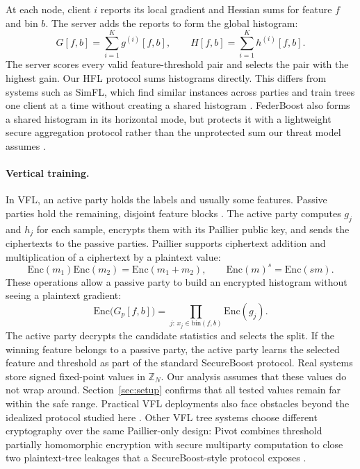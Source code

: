\documentclass[11pt]{article}
\newcommand{\rev}[1]{{\color{blue}#1}}
\begin{document}
At each node, client $i$ reports its local gradient and Hessian sums for feature $f$ and bin $b$. The server adds the reports to form the global histogram:
\begin{equation}
G[f,b] = \sum_{i=1}^K g^{(i)}[f,b], \qquad
H[f,b] = \sum_{i=1}^K h^{(i)}[f,b].
\label{eq:hflagg}
\end{equation}
The server scores every valid feature-threshold pair and selects the pair with the highest gain. Our HFL protocol sums histograms directly. This differs from systems such as SimFL, which find similar instances across parties and train trees one client at a time without creating a shared histogram \cite{li2020fedgbdt}. FederBoost also forms a shared histogram in its horizontal mode, but protects it with a lightweight secure aggregation protocol rather than the unprotected sum our threat model assumes \cite{tian2020federboost}.

\paragraph{Vertical training.}
In VFL, an active party holds the labels and usually some features. Passive parties hold the remaining, disjoint feature blocks \cite{cheng2021secureboost}. The active party computes $g_j$ and $h_j$ for each sample, encrypts them with its Paillier public key, and sends the ciphertexts to the passive parties. Paillier supports ciphertext addition and multiplication of a ciphertext by a plaintext value:
\begin{equation}
\mathrm{Enc}(m_1)\mathrm{Enc}(m_2)=\mathrm{Enc}(m_1+m_2), \qquad
\mathrm{Enc}(m)^s=\mathrm{Enc}(sm).
\label{eq:paillier}
\end{equation}
These operations allow a passive party to build an encrypted histogram without seeing a plaintext gradient:
\begin{equation}
\mathrm{Enc}\bigl(G_p[f,b]\bigr)
= \prod_{j:\,x_j\in\mathrm{bin}(f,b)} \mathrm{Enc}(g_j).
\label{eq:vflagg}
\end{equation}
The active party decrypts the candidate statistics and selects the split. If the winning feature belongs to a passive party, the active party learns the selected feature and threshold as part of the standard SecureBoost protocol. Real systems store signed fixed-point values in $\mathbb{Z}_N$. Our analysis assumes that these values do not wrap around. Section~\ref{sec:setup} confirms that all tested values remain far within the safe range. \rev{Practical VFL deployments also face obstacles beyond the idealized protocol studied here \cite{wu2025vflpractice}.} Other VFL tree systems choose different cryptography over the same Paillier-only design: Pivot combines threshold partially homomorphic encryption with secure multiparty computation to close two plaintext-tree leakages that a SecureBoost-style protocol exposes \cite{wu2020pivot}.
\end{document}
